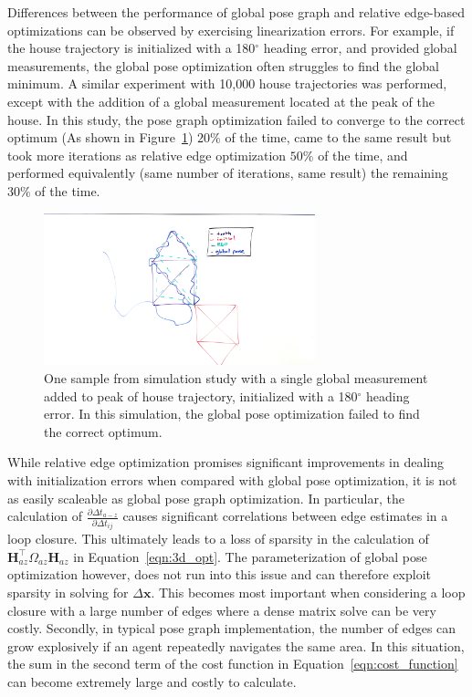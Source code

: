Differences between the performance of global pose graph and relative edge-based optimizations can be observed by exercising linearization errors.  For example, if the house trajectory is initialized with a 180$^\circ$ heading error, and provided global measurements, the global pose optimization often struggles to find the global minimum.  A similar experiment with 10,000 house trajectories was performed, except with the addition of a global measurement located at the peak of the house.  In this study, the pose graph optimization failed to converge to the correct optimum (As shown in Figure~\ref{fig:g2o_heading_divergence}) $20\%$ of the time, came to the same result but took more iterations as relative edge optimization $50\%$ of the time, and performed equivalently (same number of iterations, same result) the remaining $30\%$ of the time.

\begin{figure}[H]
  \includegraphics[width=0.7\textwidth]{figures/house_g2o_diverged.jpg}
  \caption{One sample from simulation study with a single global measurement added to peak of house trajectory,  initialized with a 180$^\circ$ heading error.  In this simulation, the global pose optimization failed to find the correct optimum.}
  \label{fig:g2o_heading_divergence}
\end{figure}

While relative edge optimization promises significant improvements in dealing with initialization errors when compared with global pose optimization, it is not as easily scaleable as global pose graph optimization.  In particular, the calculation of $\frac {\partial\Delta t_{a-z}}{\partial\Delta t_{ij}}$ causes significant correlations between edge estimates in a loop closure.  This ultimately leads to a loss of sparsity in the calculation of $\mathbf{H}_{az}^\top \Omega_{az} \mathbf{H}_{az}$ in Equation~\ref{eqn:3d_opt}.  The parameterization of global pose optimization however, does not run into this issue and can therefore exploit sparsity in solving for $\Delta \mathbf{x}$.  This becomes most important when considering a loop closure with a large number of edges where a dense matrix solve can be very costly. Secondly, in typical pose graph implementation, the number of edges can grow explosively if an agent repeatedly navigates the same area.  In this situation, the sum in the second term of the cost function in Equation~\ref{eqn:cost_function} can become extremely large and costly to calculate.

